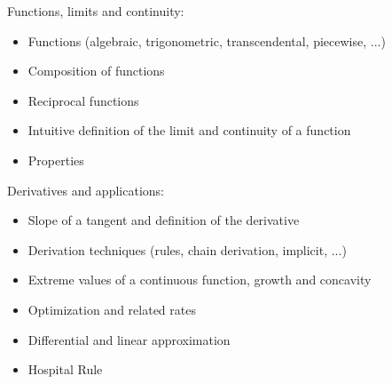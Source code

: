 Functions, limits and continuity:
\begin{itemize}
    \item Functions (algebraic, trigonometric, transcendental, piecewise, ...)
    \item Composition of functions
    \item Reciprocal functions
    \item Intuitive definition of the limit and continuity of a function
    \item Properties
\end{itemize}
Derivatives and applications:
\begin{itemize}
    \item Slope of a tangent and definition of the derivative
    \item Derivation techniques (rules, chain derivation, implicit, ...)
    \item Extreme values of a continuous function, growth and concavity
    \item Optimization and related rates
    \item Differential and linear approximation
    \item Hospital Rule
\end{itemize}